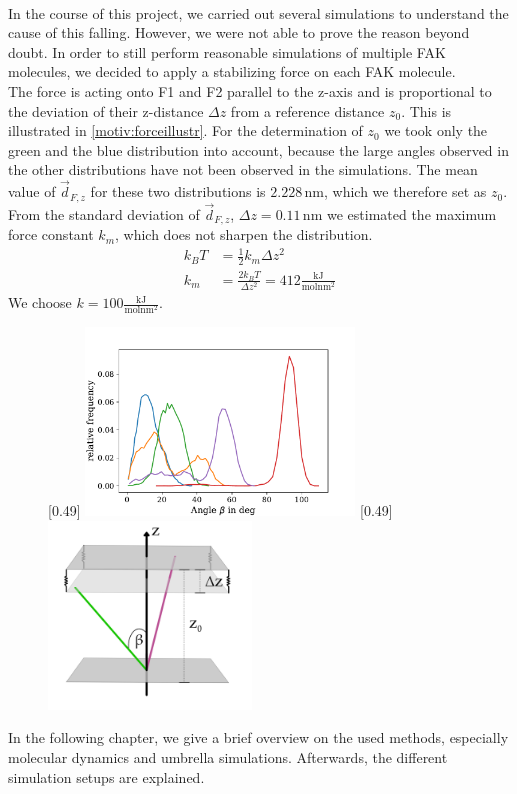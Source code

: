 \\
In the course of this project, we carried out several simulations to understand the cause of this falling. However, we were not able to prove the reason beyond doubt. In order to still perform reasonable simulations of multiple FAK molecules, we decided to apply a stabilizing force on each FAK molecule.\\
The force is acting onto F1 and F2 parallel to the z-axis and is proportional to the deviation of their z-distance $\Delta z$ from a reference distance $z_0$. This is illustrated in \autoref{motiv:forceillustr}. For the determination of $z_0$ we took only the green and the blue distribution into account, because the large angles observed in the other distributions have not been observed in the \charmm{} simulations. The mean value of $\vec{d}_{F, z}$ for these two distributions is $2.228\,\si{\nano\metre}$, which we therefore set as $z_0$. From the standard deviation of $\vec{d}_{F, z}$, $\Delta z = 0.11\,\si{\nano\metre}$ we estimated the maximum force constant $k_m$, which does not sharpen the distribution.
\begin{align}
	k_B T &= \frac{1}{2} k_m \Delta z^2\\
	k_m &= \frac{2 k_B T}{\Delta z^2} = 412 \frac{\si{\kilo\joule}}{\si{\mole} \si{\nano\metre}^2}
\end{align} 
We choose $k = 100 \frac{\si{\kilo\joule}}{\si{\mole} \si{\nano\metre}^2}$.
%
%
%
\begin{figure}
	\subcaptionbox{\label{motiv:sarascurves}}[0.49\textwidth]{
		\includegraphics[height=5cm]{figures/introduction/sara_angles}
	}\hfill%
	\subcaptionbox{\label{motiv:forceillustr}}[0.49\textwidth]{
		\includegraphics[height=5cm]{figures/introduction/forceapproach}
	}%
\end{figure}
%
%
%
In the following chapter, we give a brief overview on the used methods, especially molecular dynamics and umbrella simulations. Afterwards, the different simulation setups are explained.
